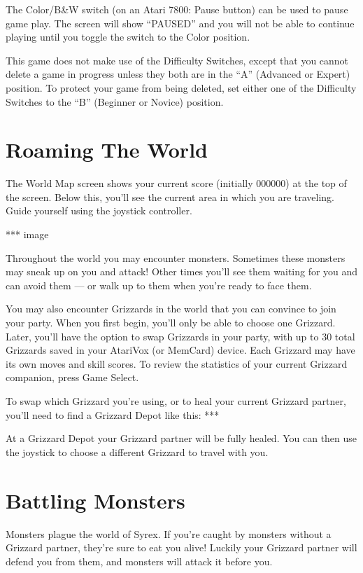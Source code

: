 \documentclass[12pt,twoside]{memoir}
\begin{document}
The Color/B\&W switch (on an Atari 7800: Pause button) can be used to pause
game play. The screen will show ``PAUSED'' and you will not be able to
continue playing until you toggle the switch to the Color position.

This game does not make use  of the Difficulty Switches, except that you
cannot  delete a  game in  progress unless  they both  are in  the ``A''
(Advanced or Expert) position. To  protect your game from being deleted,
set either  one of  the Difficulty  Switches to  the ``B''  (Beginner or
Novice) position.


\section{Roaming The World}

The World Map screen shows your  current score (initially 000000) at the
top of the screen. Below this, you'll  see the current area in which you
are traveling. Guide yourself using the joystick controller.

*** image

Throughout  the  world  you  may  encounter  monsters.  Sometimes  these
monsters may  sneak up on  you and attack!  Other times you'll  see them
waiting for you  and can avoid them  --- or walk up to  them when you're
ready to face them.

You may also  encounter Grizzards in the world that  you can convince to
join your party. When you first begin, you'll only be able to choose one
Grizzard. Later, you'll have the option to swap Grizzards in your party,
with  up to  30  total Grizzards  saved in  your  AtariVox (or  MemCard)
device. Each Grizzard may have its own moves and skill scores. To review
the statistics of your current Grizzard companion, press Game Select.

To swap which Grizzard you're using, or to heal your current Grizzard
partner, you'll need to find a Grizzard Depot like this: ***

At a Grizzard Depot your Grizzard partner will be fully healed. You can
then use the joystick to choose a different Grizzard to travel with you.


\section{Battling Monsters}

Monsters plague the world of Syrex. If you're caught by monsters without
a Grizzard partner, they're sure to eat you alive! Luckily your Grizzard
partner  will  defend  you  from  them,  and  monsters  will  attack  it
before you.
\end{document}
